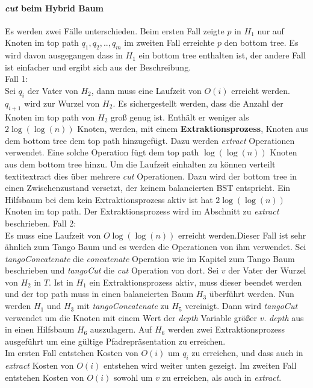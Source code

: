 \documentclass[a4paper,12pt]{article}
\begin{document}
\paragraph{\textit{cut} beim Hybrid Baum}
Es werden zwei Fälle unterschieden. Beim ersten Fall zeigte $p$ in $H_1$ nur auf Knoten im top path $q_1,q_2,..,q_m$ im zweiten Fall erreichte $p$ den bottom tree. Es wird davon ausgegangen dass in $H_1$ ein bottom tree enthalten ist, der andere Fall ist einfacher und ergibt sich aus der Beschreibung.\\
Fall 1:\\
Sei $q_i$ der Vater von $H_2$, dann muss eine Laufzeit von $O\left(i\right)$ erreicht werden. $q_{i+1}$ wird zur Wurzel von $H_2$. Es sichergestellt werden, dass die Anzahl der Knoten im top path von $H_2$ groß genug ist. Enthält er weniger als $2 \log\left(\log\left(n\right)\right)$ Knoten, werden, mit einem \textbf{Extraktionsprozess}, Knoten aus dem bottom tree dem top path hinzugefügt. Dazu werden \textit{extract} Operationen verwendet. Eine solche Operation fügt dem top path $\log\left(\log\left(n\right)\right)$ Knoten aus dem bottom tree hinzu. Um die Laufzeit einhalten zu können verteilt textit{extract} dies über mehrere \textit{cut} Operationen. Dazu wird der bottom tree in einen Zwischenzustand versetzt, der keinem balancierten BST entspricht. Ein Hilfsbaum bei dem kein Extraktionsprozess aktiv ist hat  $2 \log\left(\log\left(n\right)\right)$ Knoten im top path. Der Extraktionsprozess wird im Abschnitt zu \textit{extract} beschrieben.  
Fall 2:\\
Es muss eine Laufzeit von $O\log\left(\log\left(n\right)\right)$ erreicht werden.Dieser Fall ist sehr ähnlich zum Tango Baum und es werden die Operationen von ihm verwendet. Sei \textit{tangoConcatenate} die \textit{concatenate} Operation wie im Kapitel zum Tango Baum beschrieben und \textit{tangoCut} die \textit{cut} Operation von dort. Sei $v$ der Vater der Wurzel von $H_2$ in $T$. Ist in $H_1$ ein Extraktionsprozess aktiv, muss dieser beendet werden und der top path muss in einen balancierten Baum $H_3$ überführt werden. Nun werden $H_1$ und $H_3$ mit \textit{tangoConcatenate}  zu $H_5$ vereinigt. Dann wird \textit{tangoCut} verwendet um die Knoten mit einem Wert der \textit{depth} Variable größer $v.$ \textit{depth} aus in einen Hilfsbaum $H_6$ auszulagern. Auf $H_6$ werden zwei Extraktionsprozess ausgeführt um eine gültige Pfadrepräsentation zu erreichen.  \\
Im ersten Fall entstehen Kosten von $O\left(i\right)$ um $q_i$ zu erreichen, und dass auch in \textit{extract} Kosten von $O\left(i\right)$ entstehen wird weiter unten gezeigt. Im zweiten Fall entstehen Kosten von $O\left(i\right)$ sowohl um $v$ zu erreichen, als auch in \textit{extract}.
\end{document}
